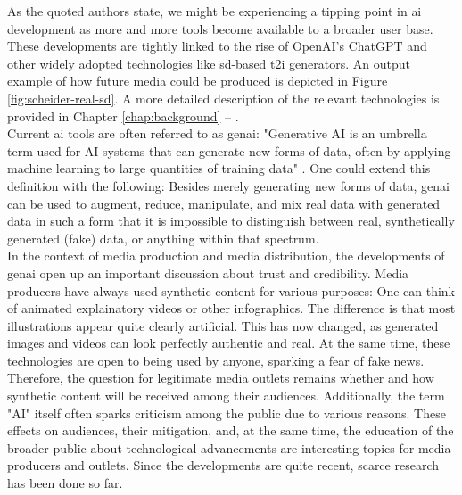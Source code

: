 \documentclass[
  a4paper,  %
  twoside,  %
  bibliography=totoc,
  headsepline,
  cleardoublepage=empty,
  parskip=half,
  draft=false
]{scrbook}
\begin{document}
As the quoted authors state, we might be experiencing a tipping point in \gls{ai} development as more and more tools become available to a broader user base. These developments are tightly linked to the rise of OpenAI's ChatGPT and other widely adopted technologies like \gls{sd}-based \gls{t2i} generators. An output example of how future media could be produced is depicted in Figure \ref{fig:scheider-real-sd}. A more detailed description of the relevant technologies is provided in Chapter \ref{chap:background} – . \\
Current \gls{ai} tools are often referred to as \gls{genai}: "Generative AI is an umbrella term used for AI systems that can generate new forms of data, often by applying machine learning to large quantities of training data" \cite{arguedasAutomatingDemocracyGenerative2023}. One could extend this definition with the following: Besides merely generating new forms of data, \gls{genai} can be used to augment, reduce, manipulate, and mix real data with generated data in such a form that it is impossible to distinguish between real, synthetically generated (fake) data, or anything within that spectrum. \\
In the context of media production and media distribution, the developments of \gls{genai} open up an important discussion about trust and credibility. Media producers have always used synthetic content for various purposes: One can think of animated explainatory videos or other infographics. The difference is that most illustrations appear quite clearly artificial. This has now changed, as generated images and videos can look perfectly authentic and real. At the same time, these technologies are open to being used by anyone, sparking a fear of fake news. Therefore, the question for legitimate media outlets remains whether and how synthetic content will be received among their audiences. Additionally, the term "AI" itself often sparks criticism among the public due to various reasons. These effects on audiences, their mitigation, and, at the same time, the education of the broader public about technological advancements are interesting topics for media producers and outlets. Since the developments are quite recent, scarce research has been done so far.
\end{document}
